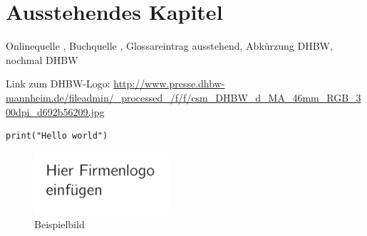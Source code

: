 \section{Ausstehendes Kapitel}

Onlinequelle \cite{OnlineKey}, Buchquelle \cite[S.~1]{BookKey}, Glossareintrag \gls{ausstehend}, Abkürzung \ac{DHBW}, nochmal \ac{DHBW}

Link zum DHBW-Logo: \url{http://www.presse.dhbw-mannheim.de/fileadmin/_processed_/f/f/csm_DHBW_d_MA_46mm_RGB_300dpi_d692b56209.jpg}

\begin{lstlisting}
print("Hello world")
\end{lstlisting}

\begin{figure}
	\caption{Beispielbild}
	\includegraphics[width=5cm]{bilder/logo.png}
\end{figure}
